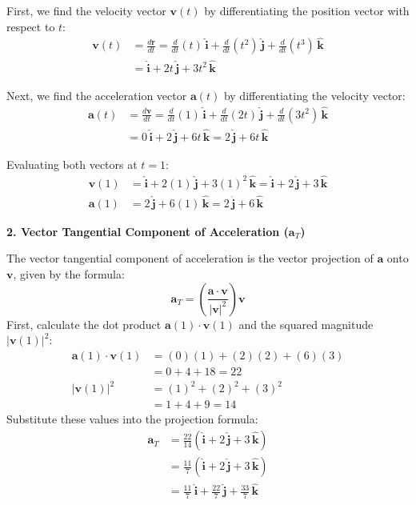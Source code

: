 \documentclass[12pt,a4paper]{article}
\begin{document}
\begin{enumerate}
\begin{tcolorbox}[enhanced,breakable,ansbox,colback=cD!4,colframe=cD,boxrule=0.8pt,arc=5pt,title={\textbf{Answer}},fonttitle=\bfseries\color{white},colbacktitle=cD]
First, we find the velocity vector $\mathbf{v}(t)$ by differentiating the position vector with respect to $t$:
\begin{align*}
    \mathbf{v}(t) &= \frac{d\mathbf{r}}{dt} = \frac{d}{dt}(t)\,\hat{\mathbf{i}} + \frac{d}{dt}(t^2)\,\hat{\mathbf{j}} + \frac{d}{dt}(t^3)\,\hat{\mathbf{k}} \\
    &= \hat{\mathbf{i}} + 2t\,\hat{\mathbf{j}} + 3t^2\,\hat{\mathbf{k}}
\end{align*}

Next, we find the acceleration vector $\mathbf{a}(t)$ by differentiating the velocity vector:
\begin{align*}
    \mathbf{a}(t) &= \frac{d\mathbf{v}}{dt} = \frac{d}{dt}(1)\,\hat{\mathbf{i}} + \frac{d}{dt}(2t)\,\hat{\mathbf{j}} + \frac{d}{dt}(3t^2)\,\hat{\mathbf{k}} \\
    &= 0\,\hat{\mathbf{i}} + 2\,\hat{\mathbf{j}} + 6t\,\hat{\mathbf{k}} = 2\,\hat{\mathbf{j}} + 6t\,\hat{\mathbf{k}}
\end{align*}

Evaluating both vectors at $t=1$:
\begin{align*}
    \mathbf{v}(1) &= \hat{\mathbf{i}} + 2(1)\,\hat{\mathbf{j}} + 3(1)^2\,\hat{\mathbf{k}} = \hat{\mathbf{i}} + 2\,\hat{\mathbf{j}} + 3\,\hat{\mathbf{k}} \\
    \mathbf{a}(1) &= 2\,\hat{\mathbf{j}} + 6(1)\,\hat{\mathbf{k}} = 2\,\hat{\mathbf{j}} + 6\,\hat{\mathbf{k}}
\end{align*}

\vspace{1em}
\textbf{2. Vector Tangential Component of Acceleration ($\mathbf{a}_T$)}

The vector tangential component of acceleration is the vector projection of $\mathbf{a}$ onto $\mathbf{v}$, given by the formula:
\[ \mathbf{a}_T = \left( \frac{\mathbf{a} \cdot \mathbf{v}}{|\mathbf{v}|^2} \right) \mathbf{v} \]
First, calculate the dot product $\mathbf{a}(1) \cdot \mathbf{v}(1)$ and the squared magnitude $|\mathbf{v}(1)|^2$:
\begin{align*}
    \mathbf{a}(1) \cdot \mathbf{v}(1) &= (0)(1) + (2)(2) + (6)(3) \\
    &= 0 + 4 + 18 = 22 \\[1em]
    |\mathbf{v}(1)|^2 &= (1)^2 + (2)^2 + (3)^2 \\
    &= 1 + 4 + 9 = 14
\end{align*}
Substitute these values into the projection formula:
\begin{align*}
    \mathbf{a}_T &= \frac{22}{14} (\hat{\mathbf{i}} + 2\,\hat{\mathbf{j}} + 3\,\hat{\mathbf{k}}) \\
    &= \frac{11}{7} (\hat{\mathbf{i}} + 2\,\hat{\mathbf{j}} + 3\,\hat{\mathbf{k}}) \\
    &= \boxed{\frac{11}{7}\,\hat{\mathbf{i}} + \frac{22}{7}\,\hat{\mathbf{j}} + \frac{33}{7}\,\hat{\mathbf{k}}}
\end{align*}


\end{tcolorbox}
\end{enumerate}
\end{document}
